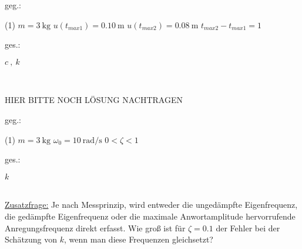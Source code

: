 


     \begin{minipage}[t]{.49\linewidth}
        geg.:
        \begin{tasks}(1)
           \task[] $m = \SI{3}{\kilo\gram}$
           \task[] $u(t_{max1}) = \SI{0.10}{\meter}$
           \task[] $u(t_{max2}) = \SI{0.08}{\meter}$
           \task[] $t_{max2}-t_{max1} = 1$
        \end{tasks}
        \end{minipage}
        \begin{minipage}[t]{.49\linewidth}
        ges.:
        \begin{tasks}
            \task $c ~,~ k$
        \end{tasks}
        \end{minipage}\\
        \vspace{1cm}

        \begin{solution}
        HIER BITTE NOCH LÖSUNG NACHTRAGEN\vfill
        \end{solution}





\begin{minipage}[t]{.49\linewidth}
    geg.:
    \begin{tasks}(1)
        \task[] $m = \SI{3}{\kilo\gram}$
        \task[] $\omega_0 = \SI{10}{\radian\per\second}$
        \task[] $0 < \zeta < 1$
    \end{tasks}
    \end{minipage}
    \begin{minipage}[t]{.49\linewidth}
    ges.:
    \begin{tasks}
        \task $k$
    \end{tasks}
\end{minipage}\\
    \vspace{1cm}
    \underline{Zusatzfrage:} Je nach Messprinzip, wird entweder die ungedämpfte
Eigenfrequenz, die gedämpfte Eigenfrequenz oder die maximale Anwortamplitude
hervorrufende Anregungsfrequenz direkt erfasst. Wie groß ist für $\zeta = 0.1$ der
Fehler bei der Schätzung von $k$, wenn man diese Frequenzen gleichsetzt?


